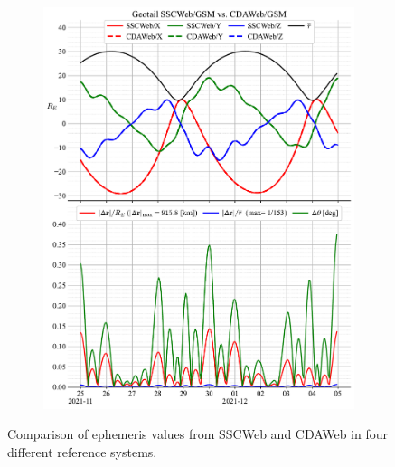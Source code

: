 \documentclass[draft]{agujournal2019}
\begin{document}
\begin{figure}[h]
\begin{subfigure}[b]{0.49\textwidth}
         \includegraphics[width=\textwidth]{code/figures/ephemeris/Geotail_SSCWeb-GSM_vs_CDAWeb-GSM.pdf}
     \end{subfigure}
     \caption{Comparison of ephemeris values from SSCWeb and CDAWeb in four different reference systems.}
     \label{fig:geotail}
\end{figure}

\clearpage
\end{document}
